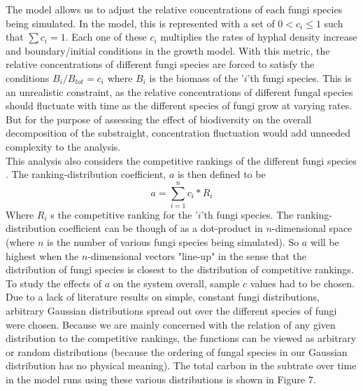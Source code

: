 \documentclass[12pt]{article}
\begin{document}
\begin{multicols}{2}
The model allows us to adjust the relative concentrations of each fungi species being simulated. In the model, this is represented with a set of $0<c_{i}\leq 1$ such that $\sum c_{i} = 1$. Each one of these $c_{i}$ multiplies the rates of hyphal density increase and boundary/initial conditions in the growth model. With this metric, the relative concentrations of different fungi species are forced to satisfy the conditions $B_{i}/B_{tot}=c_{i}$ where $B_{i}$ is the biomass of the '$i$'th fungi species. This is an unrealistic constraint, as the relative concentrations of different fungal species should fluctuate with time as the different species of fungi grow at varying rates. But for the purpose of assessing the effect of biodiversity on the overall decomposition of the substraight, concentration fluctuation would add unneeded complexity to the analysis. \\
This analysis also considers the competitive rankings of the different fungi species \cite{Maynard2019}. The ranking-distribution coefficient, $a$ is then defined to be
\begin{equation}
a = \sum_{i=1}^{n} c_{i}*R_{i}
\end{equation}
Where $R_{i}$ s the competitive ranking for the '$i$'th fungi species. The ranking-distribution coefficient can be though of as a dot-product in $n$-dimensional space (where $n$ is the number of various fungi species being simulated). So $a$ will be highest when the $n$-dimensional vectors "line-up" in the sense that the distribution of fungi species is closest to the distribution of competitive rankings.\\
To study the effects of $a$ on the system overall, sample $c$ values had to be chosen. Due to a lack of literature results on simple, constant fungi distributions, arbitrary Gaussian distributions spread out over the different species of fungi were chosen. Because we are mainly concerned with the relation of any given distribution to the competitive rankings, the functions can be viewed as arbitrary or random distributions (because the ordering of fungal species in our Gaussian distribution has no physical meaning). The total carbon in the subtrate over time in the model runs using these various distributions is shown in Figure 7. 


\end{multicols}
\end{document}
